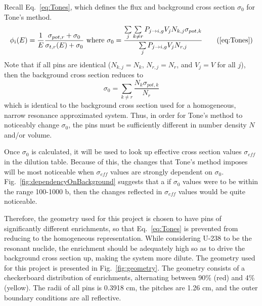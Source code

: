 \documentclass[10pt]{article}
\begin{document}
Recall Eq.~\ref{eq:Tones}, which defines the flux and background cross section $\sigma_0$ for Tone's method.
\begin{equation*}\phi_i(E)=\frac{1}{E}\frac{\sigma_{pot,r}+\sigma_{0}}{\sigma_{t,r}(E)+\sigma_{0}}~\mbox{where }\sigma_{0}=\frac{\sum\limits_j\sum\limits_{k\neq r}P_{j\rightarrow i,g}V_{j}N_{k,j}\sigma_{pot,k}}{\sum\limits_jP_{j\rightarrow i,g}V_{j}N_{r,j}}\tag{\ref{eq:Tones}}\end{equation*}
  Note that if all pins are identical ($N_{k,j}=N_k$, $N_{r,j}=N_r$, and $V_j=V$ for all $j$), then the background cross section reduces to 
  \begin{equation}\sigma_0=\sum\limits_{k\neq r}\frac{N_k\sigma_{pot,k}}{N_r}\end{equation}
    which is identical to the background cross section used for a homogeneous, narrow resonance approximated system. Thus, in order for Tone's method to noticeably change $\sigma_0$, the pins must be sufficiently different in number density $N$ and/or volume. \par
    Once $\sigma_0$ is calculated, it will be used to look up effective cross section values $\sigma_{eff}$ in the dilution table. Because of this, the changes that Tone's method imposes will be most noticeable when $\sigma_{eff}$ values are strongly dependent on $\sigma_0$. Fig.~\ref{fig:dependencyOnBackground} suggests that a if $\sigma_0$ values were to be within the range 100-1000 b, then the changes reflected in $\sigma_{eff}$ values would be quite noticeable.\par
    Therefore, the geometry used for this project is chosen to have pins of significantly different enrichments, so that Eq.~\ref{eq:Tones} is prevented from reducing to the homogeneous representation. While considering U-238 to be the resonant nuclide, the enrichment should be adequately high so as to drive the background cross section up, making the system more dilute. The geometry used for this project is presented in Fig.~\ref{fig:geometry}. The geometry consists of a checkerboard distribution of enrichments, alternating between 90\% (red) and 4\% (yellow). The radii of all pins is 0.3918 cm, the pitches are 1.26 cm, and the outer boundary conditions are all reflective.
    
\end{document}
